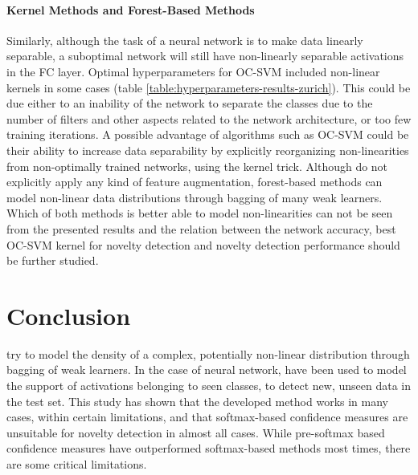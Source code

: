 \documentclass[10pt]{article}
\begin{document}
\paragraph{Kernel Methods and Forest-Based Methods} Similarly, although the task of a neural network is to make data linearly separable, a suboptimal network will still have non-linearly separable activations in the \gls{FC} layer. Optimal hyperparameters for \gls{OC-SVM} included non-linear kernels in some cases (table \ref{table:hyperparameters-results-zurich}). This could be due either to an inability of the network to separate the classes due to the number of filters and other aspects related to the network architecture, or too few training iterations. A possible advantage of algorithms such as \gls{OC-SVM} could be their ability to increase data separability by explicitly reorganizing non-linearities from non-optimally trained networks, using the kernel trick. Although  do not explicitly apply any kind of feature augmentation, forest-based methods can model non-linear data distributions through bagging of many weak learners. Which of both methods is better able to model non-linearities can not be seen from the presented results and the relation between the network accuracy, best \gls{OC-SVM} kernel for novelty detection and novelty detection performance should be further studied.

\section{Conclusion}
 try to model the density of a complex, potentially non-linear distribution through bagging of weak learners. In the case of neural network,  have been used to model the support of activations belonging to seen classes, to detect new, unseen data in the test set. This study has shown that the developed method works in many cases, within certain limitations, and that softmax-based confidence measures are unsuitable for novelty detection in almost all cases. While pre-softmax based confidence measures have outperformed softmax-based methods most times, there are some critical limitations.
\end{document}
